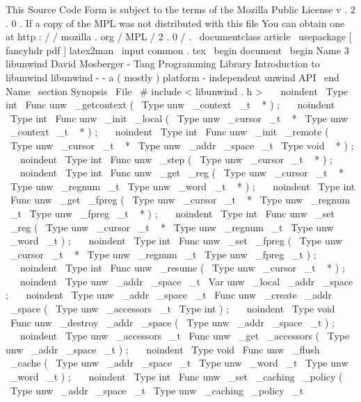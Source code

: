 %
This
Source
Code
Form
is
subject
to
the
terms
of
the
Mozilla
Public
%
License
v
.
2
.
0
.
If
a
copy
of
the
MPL
was
not
distributed
with
this
%
file
You
can
obtain
one
at
http
:
/
/
mozilla
.
org
/
MPL
/
2
.
0
/
.
\
documentclass
{
article
}
\
usepackage
[
fancyhdr
pdf
]
{
latex2man
}
\
input
{
common
.
tex
}
\
begin
{
document
}
\
begin
{
Name
}
{
3
}
{
libunwind
}
{
David
Mosberger
-
Tang
}
{
Programming
Library
}
{
Introduction
to
libunwind
}
libunwind
-
-
a
(
mostly
)
platform
-
independent
unwind
API
\
end
{
Name
}
\
section
{
Synopsis
}
\
File
{
\
#
include
<
libunwind
.
h
>
}
\
\
\
noindent
\
Type
{
int
}
\
Func
{
unw
\
_getcontext
}
(
\
Type
{
unw
\
_context
\
_t
~
*
}
)
;
\
\
\
noindent
\
Type
{
int
}
\
Func
{
unw
\
_init
\
_local
}
(
\
Type
{
unw
\
_cursor
\
_t
~
*
}
\
Type
{
unw
\
_context
\
_t
~
*
}
)
;
\
\
\
noindent
\
Type
{
int
}
\
Func
{
unw
\
_init
\
_remote
}
(
\
Type
{
unw
\
_cursor
\
_t
~
*
}
\
Type
{
unw
\
_addr
\
_space
\
_t
}
\
Type
{
void
~
*
}
)
;
\
\
\
noindent
\
Type
{
int
}
\
Func
{
unw
\
_step
}
(
\
Type
{
unw
\
_cursor
\
_t
~
*
}
)
;
\
\
\
noindent
\
Type
{
int
}
\
Func
{
unw
\
_get
\
_reg
}
(
\
Type
{
unw
\
_cursor
\
_t
~
*
}
\
Type
{
unw
\
_regnum
\
_t
}
\
Type
{
unw
\
_word
\
_t
~
*
}
)
;
\
\
\
noindent
\
Type
{
int
}
\
Func
{
unw
\
_get
\
_fpreg
}
(
\
Type
{
unw
\
_cursor
\
_t
~
*
}
\
Type
{
unw
\
_regnum
\
_t
}
\
Type
{
unw
\
_fpreg
\
_t
~
*
}
)
;
\
\
\
noindent
\
Type
{
int
}
\
Func
{
unw
\
_set
\
_reg
}
(
\
Type
{
unw
\
_cursor
\
_t
~
*
}
\
Type
{
unw
\
_regnum
\
_t
}
\
Type
{
unw
\
_word
\
_t
}
)
;
\
\
\
noindent
\
Type
{
int
}
\
Func
{
unw
\
_set
\
_fpreg
}
(
\
Type
{
unw
\
_cursor
\
_t
~
*
}
\
Type
{
unw
\
_regnum
\
_t
}
\
Type
{
unw
\
_fpreg
\
_t
}
)
;
\
\
\
noindent
\
Type
{
int
}
\
Func
{
unw
\
_resume
}
(
\
Type
{
unw
\
_cursor
\
_t
~
*
}
)
;
\
\
\
noindent
\
Type
{
unw
\
_addr
\
_space
\
_t
}
\
Var
{
unw
\
_local
\
_addr
\
_space
}
;
\
\
\
noindent
\
Type
{
unw
\
_addr
\
_space
\
_t
}
\
Func
{
unw
\
_create
\
_addr
\
_space
}
(
\
Type
{
unw
\
_accessors
\
_t
}
\
Type
{
int
}
)
;
\
\
\
noindent
\
Type
{
void
}
\
Func
{
unw
\
_destroy
\
_addr
\
_space
}
(
\
Type
{
unw
\
_addr
\
_space
\
_t
}
)
;
\
\
\
noindent
\
Type
{
unw
\
_accessors
\
_t
}
\
Func
{
unw
\
_get
\
_accessors
}
(
\
Type
{
unw
\
_addr
\
_space
\
_t
}
)
;
\
\
\
noindent
\
Type
{
void
}
\
Func
{
unw
\
_flush
\
_cache
}
(
\
Type
{
unw
\
_addr
\
_space
\
_t
}
\
Type
{
unw
\
_word
\
_t
}
\
Type
{
unw
\
_word
\
_t
}
)
;
\
\
\
noindent
\
Type
{
int
}
\
Func
{
unw
\
_set
\
_caching
\
_policy
}
(
\
Type
{
unw
\
_addr
\
_space
\
_t
}
\
Type
{
unw
\
_caching
\
_policy
\
_t
}
